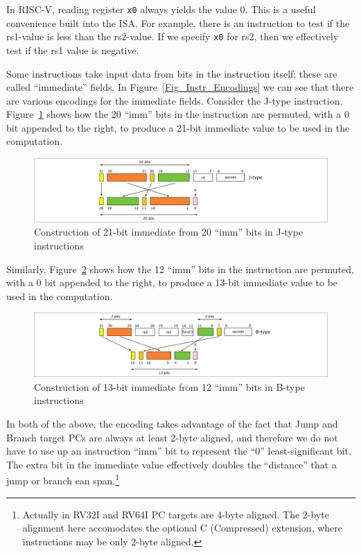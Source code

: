 In RISC-V, reading register \verb|x0| always yields the value 0.  This
is a useful convenience built into the ISA.  For example, there is an
instruction to test if the rs1-value is less than the rs2-value.  If
we specify \verb|x0| for rs2, then we effectively test if the rs1
value is negative.

Some instructions take input data from bits in the instruction itself;
these are called ``immediate'' fields.  In
Figure~\ref{Fig_Instr_Encodings} we can see that there are various
encodings for the immediate fields.  Consider the J-type instruction.
Figure~\ref{Fig_J_imm} shows how the 20 ``imm'' bits in the
instruction are permuted, with a 0 bit appended to the right, to
produce a 21-bit immediate value to be used in the computation.
\begin{figure}[htbp]
  \centerline{\includegraphics[width=6in,angle=0]{Figures/Fig_J_imm}}
  \caption{\label{Fig_J_imm} Construction of 21-bit immediate from 20 ``imm'' bits in J-type instructions}
\end{figure}

Similarly, Figure~\ref{Fig_B_imm} shows how the 12 ``imm'' bits in the
instruction are permuted, with a 0 bit appended to the right, to
produce a 13-bit immediate value to be used in the computation.
\begin{figure}[htbp]
  \centerline{\includegraphics[width=6in,angle=0]{Figures/Fig_B_imm}}
  \caption{\label{Fig_B_imm} Construction of 13-bit immediate from 12 ``imm'' bits in B-type instructions}
\end{figure}

In both of the above, the encoding takes advantage of the fact that
Jump and Branch target PCs are always at least 2-byte aligned, and
therefore we do not have to use up an instruction ``imm'' bit to
represent the ``0'' least-significant bit.  The extra bit in the
immediate value effectively doubles the ``distance'' that a jump or
branch can span.\footnote{Actually in RV32I and RV64I PC targets are
4-byte aligned. The 2-byte alignment here accomodates the optional C
(Compressed) extension, where instructions may be only 2-byte
aligned.}

